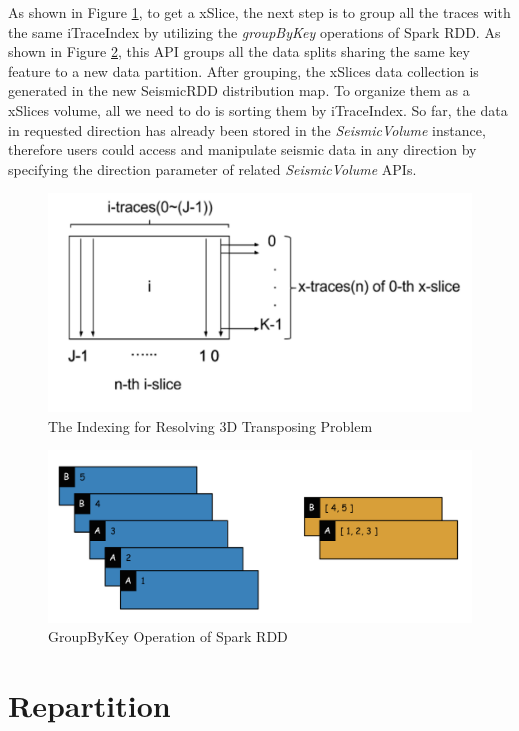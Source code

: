 As shown in Figure \ref{VolumeTrans}, to get a xSlice, the next step is to group all the traces with the same iTraceIndex by utilizing the \emph{groupByKey} operations of Spark RDD. As shown in Figure \ref{RDDGroup}, this API groups all the data splits sharing the same key feature to a new data partition. After grouping, the xSlices data collection is generated in the new SeismicRDD distribution map. To organize them as a xSlices volume, all we need to do is sorting them by iTraceIndex. So far, the data in requested direction has already been stored in the \emph{SeismicVolume} instance, therefore users could access and manipulate seismic data in any direction by specifying the direction parameter of related \emph{SeismicVolume} APIs.

\begin{figure}[h]
\centering
\includegraphics[scale=0.6]{figures/VolumeTrans.png}
\caption{The Indexing for Resolving 3D Transposing Problem}
\label{VolumeTrans}
\end{figure}

\begin{figure}[h]
\centering
\includegraphics[scale=0.4]{figures/RDDGroup.png}
\caption{GroupByKey Operation of Spark RDD}
\label{RDDGroup}
\end{figure}


\section{Repartition}

